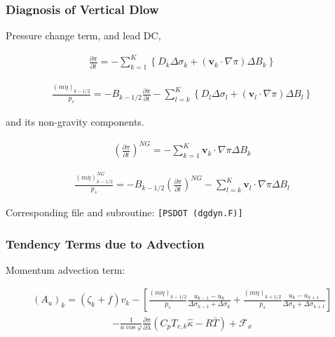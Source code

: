 \hypertarget{diagnosis-of-vertical-dlow}{%
\subsubsection{Diagnosis of Vertical Dlow}\label{diagnosis-of-vertical-dlow}}

Pressure change term, and lead DC,

\begin{eqnarray}
  \frac{\partial \pi}{\partial t}
   = - \sum_{k=1}^{K} \left\{ D_k \Delta\sigma_k + ({\mathbf{v}}_k \cdot \nabla \pi)\Delta B_k \right\}
\end{eqnarray}

\begin{eqnarray}
  \frac{(m\dot{\eta})_{k-1/2}}{p_s}
   = - B_{k-1/2} \frac{\partial \pi}{\partial t}
    - \sum_{l=k}^{K}\left\{ D_l \Delta\sigma_l + ({\mathbf{v}}_l \cdot \nabla \pi)\Delta B_l \right\}
\end{eqnarray}

and its non-gravity components.

\begin{eqnarray}
  \left( \frac{\partial \pi}{\partial t} \right)^{NG}
   =   - \sum_{k=1}^{K} {\mathbf{v}}_{k} \cdot \nabla \pi  
       \Delta B_{k}
\end{eqnarray}

\begin{eqnarray}
  \frac{(m\dot{\eta})^{NG}_{k-1/2}}{p_s}
   = - B_{k-1/2} \left( \frac{\partial \pi}{\partial t} \right)^{NG}
    - \sum_{l=k}^{K} {\mathbf{v}}_{l} \cdot \nabla \pi
       \Delta B_{l}
\end{eqnarray}

Corresponding file and subroutine: \texttt{{[}PSDOT\ (dgdyn.F){]}}

\hypertarget{tendency-terms-due-to-advection}{%
\subsubsection{Tendency Terms due to Advection}\label{tendency-terms-due-to-advection}}

Momentum advection term:

\begin{eqnarray}
  (A_u)_k
    =  ( \zeta_k + f ) v_k
             - \left[ \frac{(m\dot{\eta})_{k-1/2}}{p_s} \frac{u_{k-1} - u_k}{\Delta\sigma_{k-1}+\Delta\sigma_k}
               + \frac{(m\dot{\eta})_{k+1/2}}{p_s} \frac{u_k   - u_{k+1}}{\Delta\sigma_{k}+\Delta\sigma_{k+1}} \right]
\end{eqnarray} \begin{eqnarray}
           - \frac{1}{a\cos\varphi} \frac{\partial \pi}{\partial \lambda}(C_p T_{v,k}\hat{\kappa}-R\bar{T})
             + {\mathcal F}_x
\end{eqnarray}

